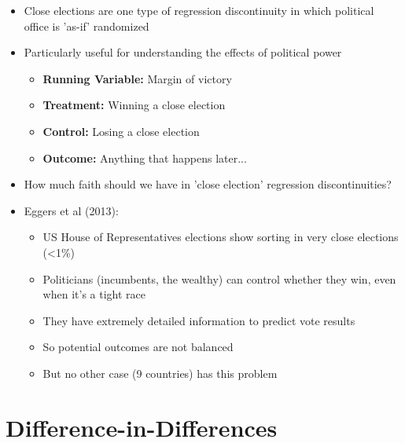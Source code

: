 \documentclass[xcolor=x11names,compress]{beamer}\usepackage[]{graphicx}\usepackage[]{xcolor}
\renewcommand{\(}{\begin{columns}}
\renewcommand{\)}{\end{columns}}
\newcommand{\<}[1]{\begin{column}{#1}}
\renewcommand{\>}{\end{column}}
\begin{document}
\begin{frame}
\begin{itemize}
\item Close elections are one type of regression discontinuity in which political office is 'as-if' randomized
\pause
\item Particularly useful for understanding the effects of political power
\pause
\begin{itemize}
\item \textbf{Running Variable: }Margin of victory
\item \textbf{Treatment: }Winning a close election
\item \textbf{Control: }Losing a close election
\item \textbf{Outcome: }Anything that happens later...
\end{itemize}
\end{itemize}
\end{frame}

\begin{frame}
\begin{itemize}
\item How much faith should we have in 'close election' regression discontinuities?
\pause
\item Eggers et al (2013):
\pause
\begin{itemize}
\item US House of Representatives elections show sorting in very close elections (<1\%)
\pause
\item Politicians (incumbents, the wealthy) can control whether they win, even when it's a tight race
\pause
\item They have extremely detailed information to predict vote results
\pause
\item So potential outcomes are not balanced
\pause
\item But no other case (9 countries) has this problem
\end{itemize}
\end{itemize}
\end{frame}



\section{Difference-in-Differences}
\end{document}
